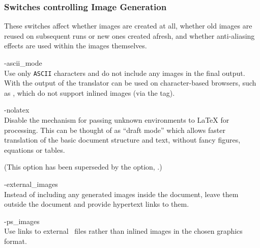 \subsubsection{Switches controlling Image Generation}
%
These switches affect whether images are created at all, whether
old images are reused on subsequent runs or new ones created afresh,
and whether anti-aliasing effects are used within the images themselves.

\begin{htmllist}%
%
% 
%
\item [ -ascii\_mode \label{asciimode}]
\\
Use only \texttt{ASCII} characters and do not include any images in the final output.
With  the output of the translator can be used on 
character-based browsers, such as ,
which do not support inlined images (via the  tag).


%
\item [ -nolatex \label{nolatex}]
\\
Disable the mechanism for passing unknown environments to \LaTeX{} for processing.
This can be thought of as ``draft mode'' which allows 
faster translation of the basic document structure and text, 
without fancy figures, equations or tables. 

(This option has been superseded by the  option,
.)


%
\item [ -external\_images\label{extimages}]
\\
Instead of including any generated images inside the document, 
leave them outside the document and provide hypertext links to them.


%
\item [ -ps\_images\label{psimages}]
\\
Use links to external \PS\ files rather than inlined images
in the chosen graphics format.


\end{htmllist}
